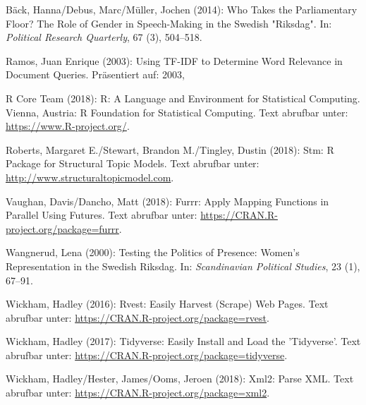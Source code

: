 \documentclass[oneside, 12pt, numbers=endperiod]{scrbook}
\theoremstyle{definition}
\theoremstyle{definition}
\theoremstyle{definition}
\theoremstyle{remark}
\begin{document}
\hypertarget{refs}{}
\leavevmode\hypertarget{ref-back_2014}{}%
Bäck, Hanna/Debus, Marc/Müller, Jochen (2014): Who Takes the
Parliamentary Floor? The Role of Gender in Speech-Making in the Swedish
"Riksdag". In: \emph{Political Research Quarterly}, 67 (3), 504--518.

\leavevmode\hypertarget{ref-ramos_2003}{}%
Ramos, Juan Enrique (2003): Using TF-IDF to Determine Word Relevance in
Document Queries. Präsentiert auf: 2003,

\leavevmode\hypertarget{ref-rcoreteam_2018}{}%
R Core Team (2018): R: A Language and Environment for Statistical
Computing. Vienna, Austria: R Foundation for Statistical Computing. Text
abrufbar unter: \url{https://www.R-project.org/}.

\leavevmode\hypertarget{ref-roberts_2018}{}%
Roberts, Margaret E./Stewart, Brandon M./Tingley, Dustin (2018): Stm: R
Package for Structural Topic Models. Text abrufbar unter:
\url{http://www.structuraltopicmodel.com}.

\leavevmode\hypertarget{ref-vaughan_2018}{}%
Vaughan, Davis/Dancho, Matt (2018): Furrr: Apply Mapping Functions in
Parallel Using Futures. Text abrufbar unter:
\url{https://CRAN.R-project.org/package=furrr}.

\leavevmode\hypertarget{ref-wangnerud_2000}{}%
Wangnerud, Lena (2000): Testing the Politics of Presence: Women's
Representation in the Swedish Riksdag. In: \emph{Scandinavian Political
Studies}, 23 (1), 67--91.

\leavevmode\hypertarget{ref-wickham_2016}{}%
Wickham, Hadley (2016): Rvest: Easily Harvest (Scrape) Web Pages. Text
abrufbar unter: \url{https://CRAN.R-project.org/package=rvest}.

\leavevmode\hypertarget{ref-wickham_2017}{}%
Wickham, Hadley (2017): Tidyverse: Easily Install and Load the
'Tidyverse'. Text abrufbar unter:
\url{https://CRAN.R-project.org/package=tidyverse}.

\leavevmode\hypertarget{ref-wickham_2018}{}%
Wickham, Hadley/Hester, James/Ooms, Jeroen (2018): Xml2: Parse XML. Text
abrufbar unter: \url{https://CRAN.R-project.org/package=xml2}.
\end{document}
